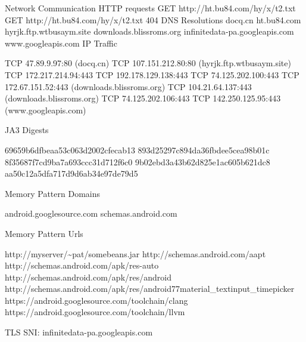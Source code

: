 \documentclass[
]{article}
\newenvironment{Shaded}{}{}
\newcommand{\NormalTok}[1]{#1}
\begin{document}
\begin{Shaded}
\begin{Highlighting}[]
\NormalTok{Network Communication}
\NormalTok{HTTP requests}
\NormalTok{GET http://ht.bu84.com/hy/x/t2.txt}
\NormalTok{GET http://ht.bu84.com/hy/x/t2.txt 404}
\NormalTok{DNS Resolutions}
\NormalTok{docq.cn}
\NormalTok{ht.bu84.com}
\NormalTok{hyrjk.ftp.wtbusaym.site}
\NormalTok{downloads.blissroms.org}
\NormalTok{infinitedata{-}pa.googleapis.com}
\NormalTok{www.googleapis.com}
\NormalTok{IP Traffic}

\NormalTok{    TCP 47.89.9.97:80 (docq.cn)}
\NormalTok{    TCP 107.151.212.80:80 (hyrjk.ftp.wtbusaym.site)}
\NormalTok{    TCP 172.217.214.94:443}
\NormalTok{    TCP 192.178.129.138:443}
\NormalTok{    TCP 74.125.202.100:443}
\NormalTok{    TCP 172.67.151.52:443 (downloads.blissroms.org)}
\NormalTok{    TCP 104.21.64.137:443 (downloads.blissroms.org)}
\NormalTok{    TCP 74.125.202.106:443}
\NormalTok{    TCP 142.250.125.95:443 (www.googleapis.com)}

\NormalTok{JA3 Digests}

\NormalTok{    69659b6dfbeaa53c063d2002cfecab13}
\NormalTok{    893d25297c894da36fbdee5cea98b01c}
\NormalTok{    8f35687f7cd9ba7a693ccc31d712f6c0}
\NormalTok{    9b02ebd3a43b62d825e1ac605b621dc8}
\NormalTok{    aa50c12a5dfa717d9d6ab34e97de79d5}

\NormalTok{Memory Pattern Domains}

\NormalTok{    android.googlesource.com}
\NormalTok{    schemas.android.com}

\NormalTok{Memory Pattern Urls}

\NormalTok{    http://myserver/\textasciitilde{}pat/somebeans.jar}
\NormalTok{    http://schemas.android.com/aapt}
\NormalTok{    http://schemas.android.com/apk/res{-}auto}
\NormalTok{    http://schemas.android.com/apk/res/android}
\NormalTok{    http://schemas.android.com/apk/res/android77material\_textinput\_timepicker}
\NormalTok{    https://android.googlesource.com/toolchain/clang}
\NormalTok{    https://android.googlesource.com/toolchain/llvm}

\NormalTok{TLS}
\NormalTok{SNI: infinitedata{-}pa.googleapis.com}
\end{Highlighting}
\end{Shaded}
\end{document}
